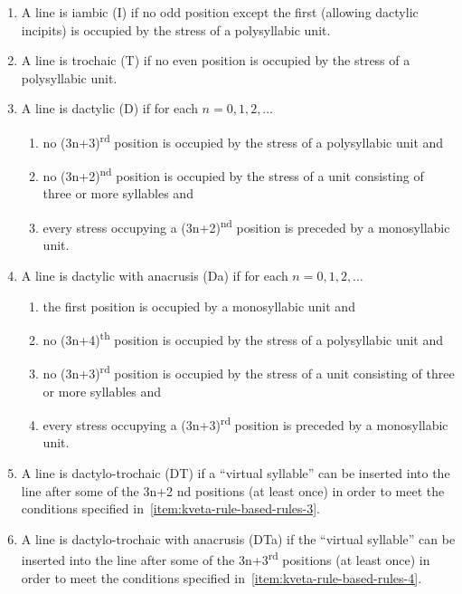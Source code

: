 \begin{enumerate}
    \item A line is iambic (I) if no odd position except the first (allowing dactylic incipits) is occupied by the stress of a polysyllabic unit.
    \item A line is trochaic (T) if no even position is occupied by the stress of a polysyllabic unit.
    \item \label{item:kveta-rule-based-rules-3} A line is dactylic (D) if for each $n = 0, 1, 2, \ldots$
        \begin{enumerate}
            \item no (3n+3)\textsuperscript{rd} position is occupied by the stress of a polysyllabic unit and
            \item \label{item:kveta-rule-based-rules-3b} no (3n+2)\textsuperscript{nd} position is occupied by the stress of a unit consisting of three or more syllables and
            \item \label{item:kveta-rule-based-rules-3c} every stress occupying a (3n+2)\textsuperscript{nd} position is preceded by a monosyllabic unit.
        \end{enumerate}
    \item \label{item:kveta-rule-based-rules-4} A line is dactylic with anacrusis (Da) if for each $n = 0, 1, 2, \ldots$
        \begin{enumerate}
            \item the first position is occupied by a monosyllabic unit and
            \item \label{item:kveta-rule-based-rules-4b} no (3n+4)\textsuperscript{th} position is occupied by the stress of a polysyllabic unit and
            \item \label{item:kveta-rule-based-rules-4c} no (3n+3)\textsuperscript{rd} position is occupied by the stress of a unit consisting of three or more syllables and
            \item every stress occupying a (3n+3)\textsuperscript{rd} position is preceded by a monosyllabic unit.
        \end{enumerate}
    \item A line is dactylo-trochaic (DT) if a \enquote{virtual syllable} can be inserted into the line after some of the 3n+2 nd positions (at least once) in order to meet the conditions specified in~\ref{item:kveta-rule-based-rules-3}.
    \item A line is dactylo-trochaic with anacrusis (DTa) if the \enquote{virtual syllable} can be inserted into the line after some of the 3n+3\textsuperscript{rd} positions (at least once) in order to meet the conditions specified in~\ref{item:kveta-rule-based-rules-4}.
\end{enumerate}

